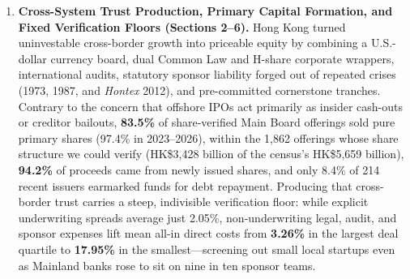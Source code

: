 \documentclass[11pt,letterpaper]{article}
\begin{document}
\begin{enumerate}
\item \textbf{Cross-System Trust Production, Primary Capital Formation, and Fixed Verification Floors (Sections 2–6).} Hong Kong turned uninvestable cross-border growth into priceable equity by combining a U.S.-dollar currency board, dual Common Law and H-share corporate wrappers, international audits, statutory sponsor liability forged out of repeated crises (1973, 1987, and \textit{Hontex} 2012), and pre-committed cornerstone tranches. Contrary to the concern that offshore IPOs act primarily as insider cash-outs or creditor bailouts, \textbf{83.5\%} of share-verified Main Board offerings sold pure primary shares (97.4\% in 2023–2026), within the 1,862 offerings whose share structure we could verify (HK\$3,428 billion of the census's HK\$5,659 billion), \textbf{94.2\%} of proceeds came from newly issued shares, and only 8.4\% of 214 recent issuers earmarked funds for debt repayment. Producing that cross-border trust carries a steep, indivisible verification floor: while explicit underwriting spreads average just 2.05\%, non-underwriting legal, audit, and sponsor expenses lift mean all-in direct costs from \textbf{3.26\%} in the largest deal quartile to \textbf{17.95\%} in the smallest—screening out small local startups even as Mainland banks rose to sit on nine in ten sponsor teams.

\end{enumerate}
\end{document}
